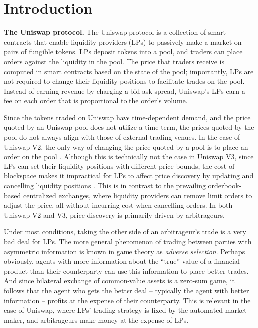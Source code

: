 \section{Introduction} \label{section:intro}

    \textbf{The Uniswap protocol.} 
        The Uniswap protocol is a collection of smart contracts that enable liquidity providers (LPs) to passively make a market on pairs of fungible tokens. LPs deposit tokens into a pool, and traders can place orders against the liquidity in the pool. The price that traders receive is computed in smart contracts based on the state of the pool; importantly, LPs are not required to change their liquidity positions to facilitate trades on the pool. Instead of earning revenue by charging a bid-ask spread, Uniswap's LPs earn a fee on each order that is proportional to the order's volume.

        Since the tokens traded on Uniswap have time-dependent demand, and the price quoted by an Uniswap pool does not utilize a time term, the prices quoted by the pool do not always align with those of external trading venues. In the case of Uniswap V2, the only way of changing the price quoted by a pool is to place an order on the pool \cite{v2Core}. Although this is technically not the case in Uniswap V3, since LPs can set their liquidity positions with different price bounds, the cost of blockspace makes it impractical for LPs to affect price discovery by updating and cancelling liquidity positions \cite{v3Core}. This is in contrast to the prevailing orderbook-based centralized exchanges, where liquidity providers can remove limit orders to adjust the price, all without incurring cost when cancelling orders. In both Uniswap V2 and V3, price discovery is primarily driven by arbitrageurs. %

        Under most conditions, taking the other side of an arbitrageur's trade is a very bad deal for LPs. The more general phenomenon of trading between parties with asymmetric information is known in game theory as \textit{adverse selection}. %
        Perhaps obviously, agents with more information about the ``true'' value of a financial product than their counterparty can use this information to place better trades. 
        And since bilateral exchange of common-value assets is a zero-sum game, %
        it follows that the agent who gets the better deal -- typically the agent with better information -- profits at the expense of their counterparty. This is relevant in the case of Uniswap, where LPs' trading strategy is fixed by the automated market maker, and arbitrageurs make money at the expense of LPs. %
        
